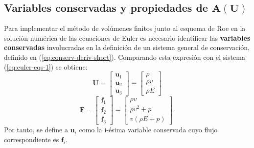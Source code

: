 \subsection{Variables conservadas y propiedades de $\mathbf{A(\mathbf{U})}$}
Para implementar el método de volúmenes finitos junto al esquema de Roe en la solución numérica de las ecuaciones de Euler es necesario identificar las \textbf{variables conservadas} involucradas en la definición de un sistema general de conservación, definido en (\ref{eq:conserv-deriv-short}). Comparando esta expresión con el sistema (\ref{eq:euler-eqs-1}) se obtiene:
\begin{equation}
	\mathbf{U} = 
	\begin{bmatrix}
		\mathbf{u}_1 \\
		\mathbf{u}_2 \\
		\mathbf{u}_3
	\end{bmatrix} \equiv
	\begin{bmatrix}
		\rho \\
		\rho v \\
		\rho E
	\end{bmatrix}
\end{equation}
\begin{equation}
	\mathbf{F} = 
	\begin{bmatrix}
		\mathbf{f}_1 \\
		\mathbf{f}_2 \\
		\mathbf{f}_3
	\end{bmatrix} \equiv
	\begin{bmatrix}
		\rho v \\
		\rho v^2 + p \\
		v(\rho E + p)
	\end{bmatrix}.
\end{equation}
Por tanto, se define a $\mathbf{u}_i$ como la i-ésima variable conservada cuyo  flujo correspondiente es $\mathbf{f}_i$. 

